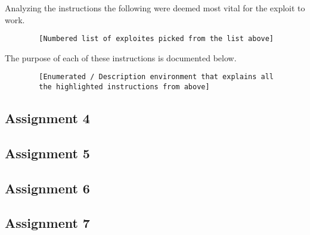 \documentclass[10pt]{article}
\begin{document}
      Analyzing the instructions the following were deemed most vital for the
      exploit to work.

      \begin{verbatim}
        [Numbered list of exploites picked from the list above]
      \end{verbatim}

      The purpose of each of these instructions is documented below.

      \begin{verbatim}
        [Enumerated / Description environment that explains all
        the highlighted instructions from above]
      \end{verbatim}


    \subsection{Assignment 4}

    \subsection{Assignment 5}

    \subsection{Assignment 6}

    \subsection{Assignment 7}
\end{document}
